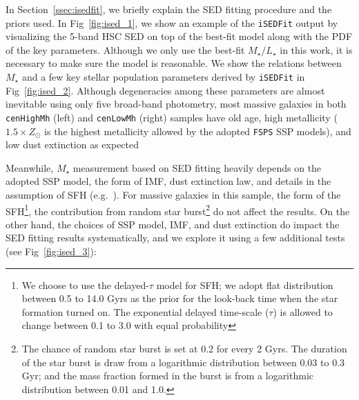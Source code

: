 \documentclass[a4paper,fleqn,usenatbib]{mnras}
\def\rbcg{\texttt{cenHighMh}}
\def\nbcg{\texttt{cenLowMh}}
\def\mstar{{$M_{\star}$}}
\def\m2l{{$M_{\star}/L_{\star}$}}
\begin{document}
    In Section~\ref{ssec:isedfit}, we briefly explain the SED fitting procedure and 
    the priors used.   
    In Fig~\ref{fig:ised_1}, we show an example of the \texttt{iSEDFit} output by 
    visualizing the 5-band HSC SED on top of the best-fit model along with the PDF 
    of the key parameters. 
    Although we only use the best-fit \m2l{} in this work, it is necessary to make 
    sure the model is reasonable. 
    We show the relations between \mstar{} and a few key stellar population parameters 
    derived by \texttt{iSEDFit} in Fig~\ref{fig:ised_2}. 
    Although degeneracies among these parameters are almost inevitable using only 
    five broad-band photometry, most massive galaxies in both \rbcg{} (left) and 
    \nbcg{} (right) samples have old age, high metallicity ($1.5 \times Z_{\odot}$ is 
    the highest metallicity allowed by the adopted \texttt{FSPS} SSP models), and low 
    dust extinction as expected
   
    Meanwhile, \mstar{} measurement based on SED fitting heavily depends on the 
    adopted SSP model, the form of IMF, dust extinction law, and details in 
    the assumption of SFH (e.g.\ \citealt{Bernardi2016b}). 
    For massive galaxies in this sample, the form of the SFH\footnote{We choose 
    to use the delayed-$\tau$ model for SFH; we adopt flat distribution between 
    0.5 to 14.0 Gyrs as the prior for the look-back time when the star formation 
    turned on. 
    The exponential delayed time-scale ($\tau$) is allowed to change between 
    0.1 to 3.0 with equal probability}, the contribution from random star 
    burst\footnote{The chance of random star burst is set at 0.2 for every 2 Gyrs. 
    The duration of the star burst is draw from a logarithmic distribution 
    between 0.03 to 0.3 Gyr; and the mass fraction formed in the burst is from 
    a logarithmic distribution between 0.01 and 1.0.} do not affect the results. 
    On the other hand, the choices of SSP model, IMF, and dust extinction do impact
    the SED fitting results systematically, and we explore it using a few 
    additional tests (see Fig~\ref{fig:ised_3}):
\end{document}
